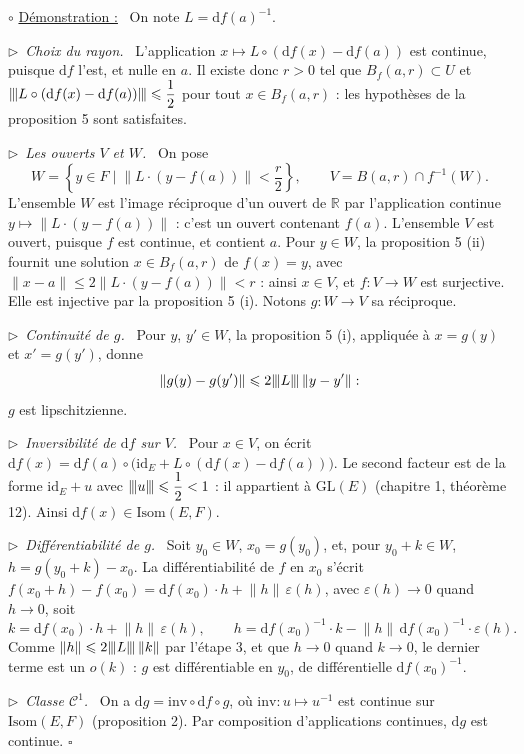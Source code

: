 \documentclass[a4paper,twoside]{report}
\newenvironment{demo}%
 {\par\needspace{4\baselineskip}\vspace{1mm}\noindent$\circ$ \underline{Démonstration :}~\setlength{\parskip}{3pt plus 1pt}}%
 {\hfill$\square$\par\vspace{2mm}}
\newcommand{\etape}[1]{\par\smallskip\noindent$\triangleright$~\textit{#1}~}
\newcommand{\R}{\mathbb{R}}
\newcommand{\id}{\mathrm{id}}                     %
\newcommand{\dd}{\mathrm{d}}                      %
\newcommand{\GL}{\mathrm{GL}}                     %
\newcommand{\norme}[1]{\lVert #1 \rVert}         %
\newcommand{\nop}[1]{|\mkern-1.5mu|\mkern-1.5mu|#1|\mkern-1.5mu|\mkern-1.5mu|}   %
\newcommand{\Bo}{B}                               %
\newcommand{\Bf}{B_{f}}                           %
\newcommand{\Cc}{\mathcal{C}}                     %
\newcommand{\Isom}{\mathrm{Isom}}                 %
\begin{document}
\begin{demo}
On note $L = \dd f(a)^{-1}$.

\etape{Choix du rayon.} L'application $x \mapsto L \circ (\dd f(x) - \dd f(a))$ est continue, puisque $\dd f$ l'est, et nulle en $a$. Il existe donc $r > 0$ tel que $\Bf(a, r) \subset U$ et $\nop{L \circ (\dd f(x) - \dd f(a))} \leqslant \dfrac{1}{2}$ pour tout $x \in \Bf(a, r)$ : les hypothèses de la proposition 5 sont satisfaites.

\etape{Les ouverts $V$ et $W$.} On pose
\[ W = \left\{y \in F \;\Big|\; \norme{L\cdot(y - f(a))} < \frac{r}{2}\right\}, \qquad V = \Bo(a, r) \cap f^{-1}(W). \]
L'ensemble $W$ est l'image réciproque d'un ouvert de $\R$ par l'application continue $y \mapsto \norme{L\cdot(y - f(a))}$ : c'est un ouvert contenant $f(a)$. L'ensemble $V$ est ouvert, puisque $f$ est continue, et contient $a$. Pour $y \in W$, la proposition 5 (ii) fournit une solution $x \in \Bf(a, r)$ de $f(x) = y$, avec $\norme{x - a} \leqslant 2\norme{L\cdot(y - f(a))} < r$ : ainsi $x \in V$, et $f : V \to W$ est surjective. Elle est injective par la proposition 5 (i). Notons $g : W \to V$ sa réciproque.

\etape{Continuité de $g$.} Pour $y$, $y' \in W$, la proposition 5 (i), appliquée à $x = g(y)$ et $x' = g(y')$, donne
\[ \norme{g(y) - g(y')} \leqslant 2\nop{L}\,\norme{y - y'} : \]
$g$ est lipschitzienne.

\etape{Inversibilité de $\dd f$ sur $V$.} Pour $x \in V$, on écrit $\dd f(x) = \dd f(a) \circ \big(\id_{E} + L \circ (\dd f(x) - \dd f(a))\big)$. Le second facteur est de la forme $\id_{E} + u$ avec $\nop{u} \leqslant \dfrac{1}{2} < 1$ : il appartient à $\GL(E)$ (chapitre 1, théorème 12). Ainsi $\dd f(x) \in \Isom(E, F)$.

\etape{Différentiabilité de $g$.} Soit $y_{0} \in W$, $x_{0} = g(y_{0})$, et, pour $y_{0} + k \in W$, $h = g(y_{0} + k) - x_{0}$. La différentiabilité de $f$ en $x_{0}$ s'écrit $f(x_{0} + h) - f(x_{0}) = \dd f(x_{0})\cdot h + \norme{h}\,\varepsilon(h)$, avec $\varepsilon(h) \to 0$ quand $h \to 0$, soit
\[ k = \dd f(x_{0})\cdot h + \norme{h}\,\varepsilon(h), \qquad h = \dd f(x_{0})^{-1}\cdot k - \norme{h}\,\dd f(x_{0})^{-1}\cdot\varepsilon(h). \]
Comme $\norme{h} \leqslant 2\nop{L}\,\norme{k}$ par l'étape 3, et que $h \to 0$ quand $k \to 0$, le dernier terme est un $o(k)$ : $g$ est différentiable en $y_{0}$, de différentielle $\dd f(x_{0})^{-1}$.

\etape{Classe $\Cc^{1}$.} On a $\dd g = \mathrm{inv} \circ \dd f \circ g$, où $\mathrm{inv} : u \mapsto u^{-1}$ est continue sur $\Isom(E, F)$ (proposition 2). Par composition d'applications continues, $\dd g$ est continue.
\end{demo}
\end{document}
